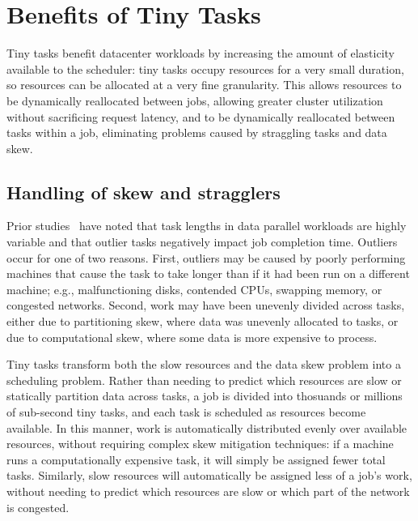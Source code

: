 \section{Benefits of Tiny Tasks}
\label{sec:benefits}


Tiny tasks benefit datacenter workloads by increasing the amount of elasticity
available to the scheduler: tiny tasks occupy resources for a very small
duration, so resources can be allocated at a very fine granularity. This
allows resources to be dynamically reallocated between jobs, allowing greater
cluster utilization without sacrificing request latency, and to be dynamically
reallocated between tasks within a job, eliminating problems caused
by straggling tasks and data skew.

\subsection{Handling of skew and stragglers}
Prior studies~\cite{ananthanarayanan2010reining,zaharia2008improving} have noted that
task lengths in data parallel workloads are highly variable and that outlier
tasks negatively impact job completion time.
Outliers occur for one of two reasons.
First, outliers may be caused by poorly performing machines that cause the
task to take longer than if it had been run on a different machine; e.g.,
malfunctioning disks, contended CPUs, swapping memory, or congested networks.
Second, work may have been unevenly
divided across tasks, either due to
partitioning skew, where data was unevenly allocated to tasks, or due to
computational skew, where some data is more expensive to process.

Tiny tasks transform both the slow resources and the data skew problem
into a scheduling problem.  Rather than needing to predict which resources
are slow or statically partition data across tasks, a job is divided into
thosuands or millions of sub-second tiny tasks, and each task is scheduled
as resources become available.  In this manner, work is automatically
distributed evenly over available resources, without requiring complex skew
mitigation techniques: if a machine runs a computationally expensive task, it
will simply be assigned fewer total tasks.  Similarly, slow resources will
automatically be assigned less of a job's work, without needing to predict which
resources are slow or which part of the network is congested.

